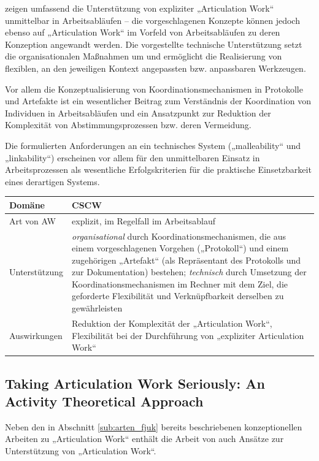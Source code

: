 \citet{Schmidt96} zeigen umfassend die Unterstützung von expliziter „Articulation Work“ unmittelbar in Arbeitsabläufen -- die vorgeschlagenen Konzepte können jedoch ebenso auf „Articulation Work“ im Vorfeld von Arbeitsabläufen zu deren Konzeption angewandt werden. Die vorgestellte technische Unterstützung setzt die organisationalen Maßnahmen um und ermöglicht die Realisierung von flexiblen, an den jeweiligen Kontext angepassten bzw. anpassbaren Werkzeugen.

Vor allem die Konzeptualisierung von Koordinationsmechanismen in Protokolle und Artefakte ist ein wesentlicher Beitrag zum Verständnis der Koordination von Individuen in Arbeitsabläufen und ein Ansatzpunkt zur Reduktion der Komplexität von Abstimmungsprozessen bzw. deren Vermeidung.

Die formulierten Anforderungen an ein technisches System („malleability“ und „linkability“) erscheinen vor allem für den unmittelbaren Einsatz in Arbeitsprozessen als wesentliche Erfolgskriterien für die praktische Einsetzbarkeit eines derartigen Systems.
\\[1em]
\begin{tabular}{| p{3cm} | p{10cm} |}
  \hline
  Domäne & \gls{CSCW} \\ \hline
  Art von AW & explizit, im Regelfall im Arbeitsablauf \\ \hline
  Unterstützung & \emph{organisational} durch Koordinationsmechanismen, die aus einem vorgeschlagenen Vorgehen („Protokoll“) und einem zugehörigen „Artefakt“ (als Repräsentant des Protokolls und zur Dokumentation) bestehen; \emph{technisch} durch Umsetzung der Koordinationsmechanismen im Rechner mit dem Ziel, die geforderte Flexibilität und Verknüpfbarkeit derselben zu gewährleisten \\ \hline
  Auswirkungen & Reduktion der Komplexität der „Articulation Work“, Flexibilität bei der Durchführung von „expliziter Articulation Work“ \\ \hline
\end{tabular}

\subsection{Taking Articulation Work Seriously: An Activity Theoretical Approach}

Neben den in Abschnitt \ref{sub:arten_fjuk} bereits beschriebenen konzeptionellen Arbeiten zu „Articulation Work“ enthält die Arbeit von \citet{Fjuk97} auch Ansätze zur Unterstützung von „Articulation Work“.

